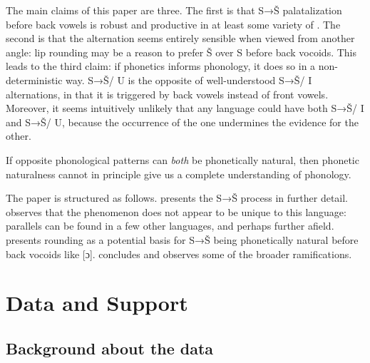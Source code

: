 \documentclass[output=paper,newtxmath,modfonts,nonflat,hidelinks]{langsci/langscibook}
\begin{document}
The main claims of this paper are three. The first is that S→Š palatalization before back vowels is robust and productive in at least some variety of . The second is that the alternation seems entirely sensible when viewed from another angle: lip rounding may be a reason to prefer Š over S before back vocoids. This leads to the third claim: if phonetics informs phonology, it does so in a non-deterministic way. S→Š/ {\longrule} U is the opposite of well-understood S→Š/ {\longrule} I alternations, in that it is triggered by back vowels instead of front vowels. Moreover, it seems intuitively unlikely that any language could have both S→Š/ {\longrule} I and S→Š/ {\longrule} U, because the occurrence of the one undermines the evidence for the other. 

If opposite phonological patterns can \textit{both} be phonetically natural, then phonetic naturalness cannot in principle give us a complete understanding of phonology.

The paper is structured as follows.  presents the  S→Š process in further detail.  observes that the phenomenon does not appear to be unique to this language: parallels can be found in a few other  languages, and perhaps further afield.  presents rounding as a potential basis for S→Š being phonetically natural before back vocoids like [ɔ].  concludes and observes some of the broader ramifications.

\section{Data and Support}\label{sec:bennett:2}

\subsection{Background about the data}\label{sec:bennett:2.1}
\end{document}
